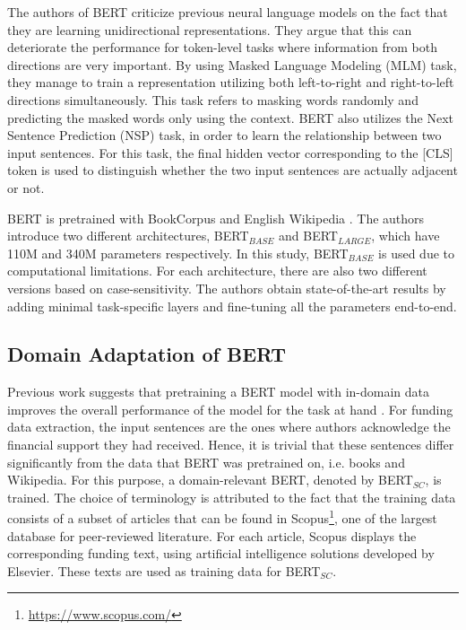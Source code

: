 \documentclass{report}
\theoremstyle{definition}
\theoremstyle{remark}
\begin{document}
The authors of BERT criticize previous neural language models on the fact that they are learning unidirectional representations. They argue that this can deteriorate the performance for token-level tasks where information from both directions are very important. By using Masked Language Modeling (MLM) task, they manage to train a representation utilizing both left-to-right and right-to-left directions simultaneously. This task refers to masking words randomly and predicting the masked words only using the context. BERT also utilizes the Next Sentence Prediction (NSP) task, in order to learn the relationship between two input sentences. For this task, the final hidden vector corresponding to the [CLS] token is used to distinguish whether the two input sentences are actually adjacent or not.

BERT is pretrained with BookCorpus \cite{bookscorpus} and English Wikipedia \cite{BERT}. The authors introduce two different architectures, BERT$_{BASE}$ and BERT$_{LARGE}$, which have 110M and 340M parameters respectively. In this study, BERT$_{BASE}$ is used due to computational limitations. For each architecture, there are also two different versions based on case-sensitivity. The authors obtain state-of-the-art results by adding minimal task-specific layers and fine-tuning all the parameters end-to-end.

\subsection{Domain Adaptation of BERT}
Previous work suggests that pretraining a BERT model with in-domain data improves the overall performance of the model for the task at hand \textcolor{red}{\cite{}}. For funding data extraction, the input sentences are the ones where authors acknowledge the financial support they had received. Hence, it is trivial that these sentences differ significantly from the data that BERT was pretrained on, i.e. books and Wikipedia.  For this purpose, a domain-relevant BERT, denoted by BERT$_{SC}$, is trained. The choice of terminology is attributed to the fact that the training data consists of a subset of articles that can be found in Scopus\footnote{\url{https://www.scopus.com/}}, one of the largest database for peer-reviewed literature. For each article, Scopus displays the corresponding funding text, using artificial intelligence solutions developed by Elsevier. These texts are used as training data for BERT$_{SC}$.
\end{document}
